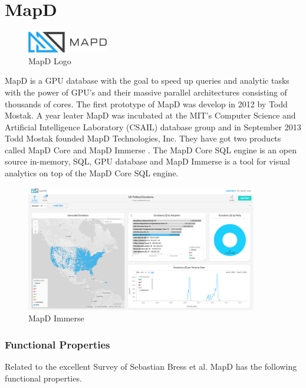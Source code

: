 \chapter{MapD}

\begin{figure}
  \begin{center}
    \includegraphics[width=100pt]{images/mapd_logo.png}
  \end{center}
  \caption[MapD]{MapD Logo}
\end{figure}


MapD is a GPU database with the goal to speed up queries and analytic tasks with the power of GPU's
and their massive parallel architectures consisting of thousands of cores.
The first prototype of MapD was develop in 2012 by Todd Mostak.
A year leater MapD was incubated at the  MIT’s Computer Science and Artificial Intelligence Laboratory (CSAIL) database group
and in September 2013 Todd Mostak founded MapD Technologies, Inc.
They have got two products called MapD Core \cite{mapdcore} and MapD Immerse \cite{immerse}.
The MapD Core SQL engine is an open source in-memory, SQL, GPU database and
MapD Immerse is a tool for visual analytics on top of the MapD Core SQL engine.


\begin{figure}[H]
    \centering
    \includegraphics[width=0.9\textwidth,height=0.9\textheight,keepaspectratio]{images/mapd_imerse.png}
    \caption{MapD Immerse \cite{filtering}}
    \label{fig:immerse}
\end{figure}


\newpage
\subsection{Functional Properties}
Related to the excellent Survey of Sebastian Bress et al. \cite{bress2014gpu} MapD has the following functional properties.

